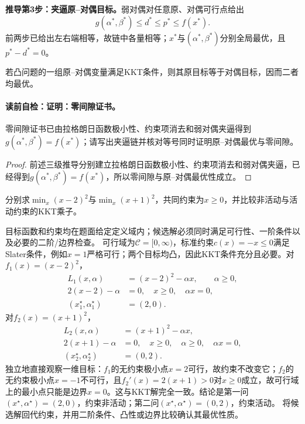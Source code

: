 \textbf{推导第3步：夹逼原--对偶目标。}弱对偶对任意原、对偶可行点给出
\[
g(\alpha^*,\beta^*)\le d^*\le p^*\le f(x^*).
\]
前两步已给出左右端相等，故链中各量相等；$x^*$与$(\alpha^*,\beta^*)$分别全局最优，且$p^*-d^*=0$。

\label{struct:V1-C07-CH14}
\begin{corollary}[零间隙证书]
若凸问题的一组原--对偶变量满足KKT条件，则其原目标等于对偶目标，因而二者均最优。
\end{corollary}
\paragraph{读前自检：证明：零间隙证书。}零间隙证书已由拉格朗日函数极小性、约束项消去和弱对偶夹逼得到$g(\alpha^*,\beta^*)=f(x^*)$；请写出夹逼链并核对等号同时证明原--对偶最优与零间隙。\par

\begin{proof}
前述三级推导分别建立拉格朗日函数极小性、约束项消去和弱对偶夹逼，已经得到$g(\alpha^*,\beta^*)=f(x^*)$，所以零间隙与原--对偶最优性成立。
\end{proof}

\label{struct:V1-C07-CH20}
\begin{example}[带非负约束的二次问题]\label{exm:V1-C07-kkt-nonnegative}
分别求$\min_x(x-2)^2$与$\min_x(x+1)^2$，共同约束为$x\ge0$，并比较非活动与活动约束的KKT乘子。
\end{example}
\begin{solution}
\SolGiven 目标函数和约束均在题面给定定义域内；候选解必须同时满足可行性、一阶条件以及必要的二阶/边界检查。
\SolDerive
可行域为$\mathcal C=[0,\infty)$，标准约束$c(x)=-x\le0$满足Slater条件，例如$x=1$严格可行；两个目标均凸，因此KKT条件充分且必要。对$f_1(x)=(x-2)^2$，
\[
\begin{aligned}
L_1(x,\alpha)&=(x-2)^2-\alpha x,\qquad \alpha\ge0,\\
2(x-2)-\alpha&=0,\quad x\ge0,\quad \alpha x=0,\\
(x_1^\star,\alpha_1^\star)&=(2,0).
\end{aligned}
\]
对$f_2(x)=(x+1)^2$，
\[
\begin{aligned}
L_2(x,\alpha)&=(x+1)^2-\alpha x,\\
2(x+1)-\alpha&=0,\quad x\ge0,\quad \alpha\ge0,\quad \alpha x=0,\\
(x_2^\star,\alpha_2^\star)&=(0,2).
\end{aligned}
\]
独立地直接观察一维目标：$f_1$的无约束极小点$x=2$可行，故约束不改变它；$f_2$的无约束极小点$x=-1$不可行，且$f_2'(x)=2(x+1)>0$对$x\ge0$成立，故可行域上的最小点只能是边界$x=0$。这与KKT解完全一致。结论是第一问$(x^\star,\alpha^\star)=(2,0)$，约束非活动；第二问$(x^\star,\alpha^\star)=(0,2)$，约束活动。
\SolCheck 将候选解回代约束，并用二阶条件、凸性或边界比较确认其最优性质。
\end{solution}

